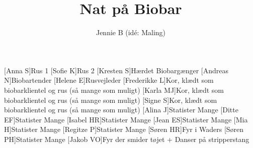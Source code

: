 \documentclass[a4paper,11pt]{article}
\title{Nat på Biobar}
\author{Jennie B (idé: Maling)}
\begin{document}
\maketitle

\begin{roles}
[Anna S]Rus 1
[Sofie K]Rus 2
[Kresten S]Hærdet Biobargænger
[Andreas N]Biobartender
[Helene E]Rusvejleder
[Frederikke L]Kor, klædt som biobarklientel og rus (så mange som muligt)
[Karla MJ]Kor, klædt som biobarklientel og rus (så mange som muligt)
[Signe S]Kor, klædt som biobarklientel og rus (så mange som muligt)
[Alina J]Statister Mange
[Ditte EF]Statister Mange
[Isabel HR]Statister Mange
[Jean ES]Statister Mange
[Mia H]Statister Mange
[Regitze P]Statister Mange
[Søren HR]Fyr i Waders
[Søren PH]Statister Mange
[Jakob VO]Fyr der smider tøjet + Danser på stripperstang
\end{roles}
\end{document}
